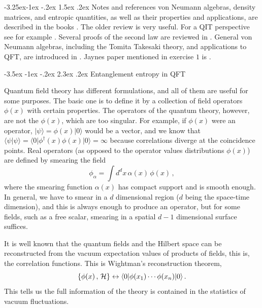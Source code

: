 \documentclass[11pt]{article}
\makeatletter
\renewcommand\section{\@startsection {section}{1}{\z@}%
                                 {-3.5ex \@plus -1ex \@minus -.2ex}%
                                   {2.3ex \@plus.2ex}%
                                   {\normalfont\large\bfseries}}
\renewcommand\subsection{\@startsection{subsection}{2}{\z@}%
                                   {-3.25ex\@plus -1ex \@minus -.2ex}%
                                     {1.5ex \@plus .2ex}%
                                     {\normalfont\bfseries}}
\numberwithin{equation}{section}
\newcommand{\be}{\begin{equation}}
\newcommand{\ee}{\end{equation}}
\makeatother
\begin{document}
\subsection{Notes and references}
 von Neumann algebras, density matrices, and entropic quantities, as well as their properties and applications, are described in the books \cite{ohya2004quantum,petz2007quantum}. The older review \cite{wehrl1978general} is very useful. For a QIT perspective see for example \cite{nielsen2002quantum,vedral}. Several proofs of the second law are reviewed in \cite{sagawa2013second}. General von Neumann algebras, including the Tomita Takesaki theory, and applications to QFT, are introduced in \cite{Haag:1992hx}. Jaynes paper mentioned in exercise $1$ is \cite{jaynes1957information}.

\newpage
 
\section{Entanglement entropy in QFT}
\label{EEQFT}

Quantum field theory has different formulations, and all of them are useful for some purposes. The basic one is to define it by a collection of field operators $\phi(x)$ with certain properties.  The operators of the quantum theory, however, are not the $\phi(x)$, which are too singular. For example, if $\phi(x)$ were an operator, $|\psi\rangle=\phi(x)|0\rangle$ would be a vector, and we know that $\langle \psi|\psi \rangle= \langle 0|\phi^\dagger(x)\phi(x)|0\rangle=\infty$ because correlations diverge at the coincidence points. Real operators (as opposed to the operator values distributions $\phi(x)$) are defined by smearing the field 
\be
\phi_\alpha=\int d^dx\, \alpha(x)\, \phi(x)\,,
\ee
where the smearing function $\alpha(x)$ has compact support and is smooth enough. In general, we have to smear in a $d$ dimensional region ($d$ being the space-time dimension), and this is always enough to produce an operator, but for some fields, such as a free scalar, smearing in a spatial $d-1$ dimensional surface suffices.

It is well known that the quantum fields and the Hilbert space can be reconstructed from the vacuum expectation values of products of fields, this is, the correlation functions. This is Wightman's reconstruction theorem,  
\be
\{\phi(x)\,, \, {\cal H}\} \leftrightarrow \langle 0| \phi(x_1)\cdots \phi(x_n)|0\rangle\,.  \label{recon}
\ee
This tells us the full information of the theory is contained in the statistics of vacuum fluctuations. 
\end{document}
